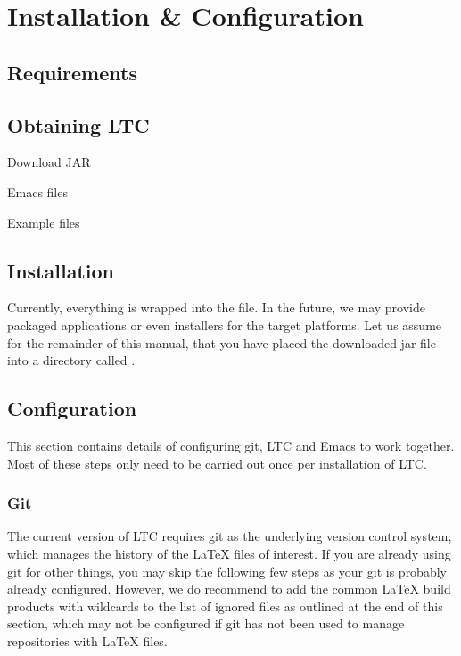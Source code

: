 \chapter{Installation \& Configuration} \label{ch:install}

\section{Requirements}

\section{Obtaining LTC}

Download JAR

Emacs files

Example files

\section{Installation}

Currently, everything is wrapped into the  file.  In the future, we may provide packaged applications or even installers for the target platforms.  Let us assume for the remainder of this manual, that you have placed the downloaded jar file into a directory called . 

\section{Configuration}

This section contains details of configuring git, LTC and Emacs to work together.  Most of these steps only need to be carried out once per installation of LTC.

\subsection{Git}

The current version of LTC requires git as the underlying version control system, which manages the history of the LaTeX files of interest. If you are already using git for other things, you may skip the following few steps as your git is probably already configured. However, we do recommend to add the common LaTeX build products with wildcards to the list of ignored files as outlined at the end of this section, which may not be configured if git has not been used to manage repositories with LaTeX files.

